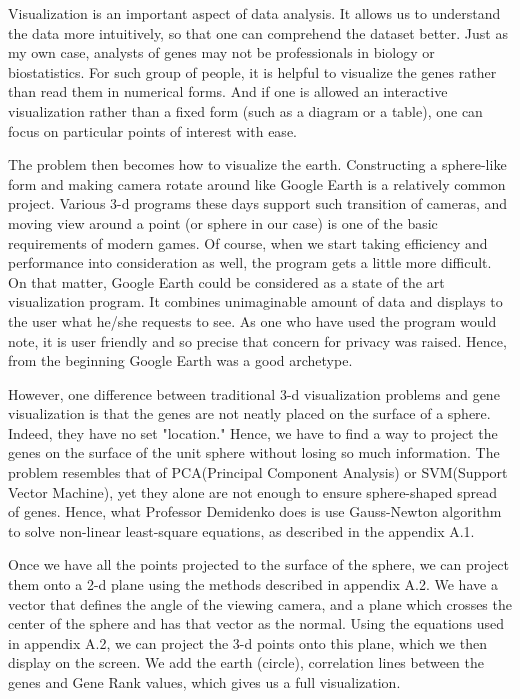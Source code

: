 \documentclass[]{article}
\begin{document}
Visualization is an important aspect of data analysis. It allows us to understand the data more intuitively, so that one can comprehend the dataset better. Just as my own case, analysts of genes may not be professionals in biology or biostatistics. For such group of people, it is helpful to visualize the genes rather than read them in numerical forms. And if one is allowed an interactive visualization rather than a fixed form (such as a diagram or a table), one can focus on particular points of interest with ease. 

The problem then becomes how to visualize the earth. Constructing a sphere-like form and making camera rotate around like Google Earth is a relatively common project. Various 3-d programs these days support such transition of cameras, and moving view around a point (or sphere in our case) is one of the basic requirements of modern games. Of course, when we start taking efficiency and performance into consideration as well, the program gets a little more difficult. On that matter, Google Earth could be considered as a state of the art visualization program. It combines unimaginable amount of data and displays to the user what he/she requests to see. As one who have used the program would note, it is user friendly and so precise that concern for privacy was raised. Hence, from the beginning Google Earth was a good archetype.

However, one difference between traditional 3-d visualization problems and gene visualization is that the genes are not neatly placed on the surface of a sphere. Indeed, they have no set "location." Hence, we have to find a way to project the genes on the surface of the unit sphere without losing so much information. The problem resembles that of PCA(Principal Component Analysis) or SVM(Support Vector Machine), yet they alone are not enough to ensure sphere-shaped spread of genes. Hence, what Professor Demidenko does is use Gauss-Newton algorithm to solve non-linear least-square equations, as described in the appendix A.1.

Once we have all the points projected to the surface of the sphere, we can project them onto a 2-d plane using the methods described in appendix A.2. We have a vector that defines the angle of the viewing camera, and a plane which crosses the center of the sphere and has that vector as the normal. Using the equations used in appendix A.2, we can project the 3-d points onto this plane, which we then display on the screen. We add the earth (circle), correlation lines between the genes and Gene Rank values, which gives us a full visualization.
\end{document}
